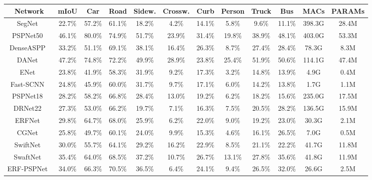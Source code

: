 \documentclass[final]{cvpr}
\begin{document}
\begin{table*}[t]
\scriptsize
\begin{center}
\begin{tabular}{c|c|cccccccc|cc}
\toprule
{\textbf{Network}}&{\textbf{mIoU}}&{\textbf{Car}}&{\textbf{Road}}&{\textbf{Sidew.}}&{\textbf{Crossw.}}&{\textbf{Curb}}&{\textbf{Person}}&{\textbf{Truck}}&{\textbf{Bus}}&{\textbf{MACs}}&{\textbf{PARAMs}}\\
\midrule
{SegNet~\cite{badrinarayanan2017segnet}}&{22.7\%}&{57.2\%}&{61.1\%}&{18.2\%}&{4.2\%}&{14.1\%}&{5.8\%}&{9.6\%}&{11.1\%}&{398.3G}&{28.4M}\\
{PSPNet50~\cite{zhao2017pyramid}}&{46.1\%}&{80.0\%}&{74.9\%}&{51.7\%}&{23.9\%}&{31.4\%}&{19.8\%}&{38.9\%}&{48.1\%}&{403.0G}&{53.3M}\\
{DenseASPP~\cite{yang2018denseaspp}}&{33.2\%}&{51.1\%}&{69.1\%}&{38.1\%}&{16.4\%}&{26.3\%}&{8.7\%}&{27.4\%}&{28.4\%}&{78.3G}&{8.3M}\\
{DANet~\cite{fu2019dual}}&{47.2\%}&{74.8\%}&{72.2\%}&{49.9\%}&{28.9\%}&{23.8\%}&{25.4\%}&{51.9\%}&{50.6\%}&{114.1G}&{47.4M}\\
\midrule
{ENet~\cite{paszke2016enet}}&{23.8\%}&{41.9\%}&{58.3\%}&{31.9\%}&{9.2\%}&{17.3\%}&{3.2\%}&{14.8\%}&{13.9\%}&{4.9G}&{0.4M}\\
{Fast-SCNN~\cite{poudel2019fast}}&{24.8\%}&{45.9\%}&{60.0\%}&{31.7\%}&{9.7\%}&{17.1\%}&{6.0\%}&{14.2\%}&{13.8\%}&{1.7G}&{1.1M}\\
{PSPNet18~\cite{zhao2017pyramid}}&{28.2\%}&{58.2\%}&{66.8\%}&{28.4\%}&{13.0\%}&{19.2\%}&{6.2\%}&{18.2\%}&{15.6\%}&{235.0G}&{17.5M}\\
{DRNet22~\cite{yu2017dilated}}&{27.3\%}&{53.0\%}&{66.2\%}&{19.7\%}&{7.1\%}&{16.3\%}&{7.5\%}&{20.5\%}&{28.2\%}&{136.5G}&{15.9M}\\
{ERFNet~\cite{romera2018erfnet}}&{29.8\%}&{64.7\%}&{68.0\%}&{25.9\%}&{6.2\%}&{22.0\%}&{9.0\%}&{19.2\%}&{23.0\%}&{30.3G}&{2.1M}\\
{CGNet~\cite{wu2018cgnet}}&{25.8\%}&{49.7\%}&{60.1\%}&{24.0\%}&{9.9\%}&{15.3\%}&{4.6\%}&{16.1\%}&{26.5\%}&{7.0G}&{0.5M}\\
{SwiftNet~\cite{orvsic2019defense}}&{30.0\%}&{55.7\%}&{64.1\%}&{29.2\%}&{16.2\%}&{22.9\%}&{8.5\%}&{21.1\%}&{22.2\%}&{41.7G}&{11.8M}\\
{SwaftNet~\cite{yang2020ds}}&{35.4\%}&{64.0\%}&{68.5\%}&{37.2\%}&{10.7\%}&{26.7\%}&{13.1\%}&{27.8\%}&{35.6\%}&{41.8G}&{11.9M}\\
{ERF-PSPNet~\cite{yang2020pass}}&{34.0\%}&{66.3\%}&{70.5\%}&{36.5\%}&{6.4\%}&{24.1\%}&{9.4\%}&{26.5\%}&{32.0\%}&{26.6G}&{2.5M}\\

\end{tabular}
\end{center}
\end{table*}
\end{document}
